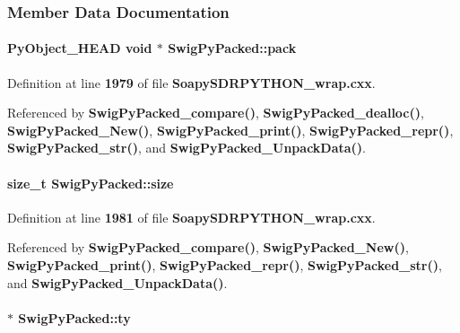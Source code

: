 \subsubsection{Member Data Documentation}
\paragraph[{pack}]{\setlength{\rightskip}{0pt plus 5cm}Py\+Object\+\_\+\+H\+E\+AD {\bf void} $\ast$ Swig\+Py\+Packed\+::pack}\label{structSwigPyPacked_a90bf060d4d9b7924acc8bc81525244d4}


Definition at line {\bf 1979} of file {\bf Soapy\+S\+D\+R\+P\+Y\+T\+H\+O\+N\+\_\+wrap.\+cxx}.



Referenced by {\bf Swig\+Py\+Packed\+\_\+compare()}, {\bf Swig\+Py\+Packed\+\_\+dealloc()}, {\bf Swig\+Py\+Packed\+\_\+\+New()}, {\bf Swig\+Py\+Packed\+\_\+print()}, {\bf Swig\+Py\+Packed\+\_\+repr()}, {\bf Swig\+Py\+Packed\+\_\+str()}, and {\bf Swig\+Py\+Packed\+\_\+\+Unpack\+Data()}.

\paragraph[{size}]{\setlength{\rightskip}{0pt plus 5cm}size\+\_\+t Swig\+Py\+Packed\+::size}\label{structSwigPyPacked_aed2bfb8fb3c9f804c386215db63921cb}


Definition at line {\bf 1981} of file {\bf Soapy\+S\+D\+R\+P\+Y\+T\+H\+O\+N\+\_\+wrap.\+cxx}.



Referenced by {\bf Swig\+Py\+Packed\+\_\+compare()}, {\bf Swig\+Py\+Packed\+\_\+\+New()}, {\bf Swig\+Py\+Packed\+\_\+print()}, {\bf Swig\+Py\+Packed\+\_\+repr()}, {\bf Swig\+Py\+Packed\+\_\+str()}, and {\bf Swig\+Py\+Packed\+\_\+\+Unpack\+Data()}.

\paragraph[{ty}]{ $\ast$ Swig\+Py\+Packed\+::ty}\label{structSwigPyPacked_ae179dcfa49ddb42652601334198d4271}


